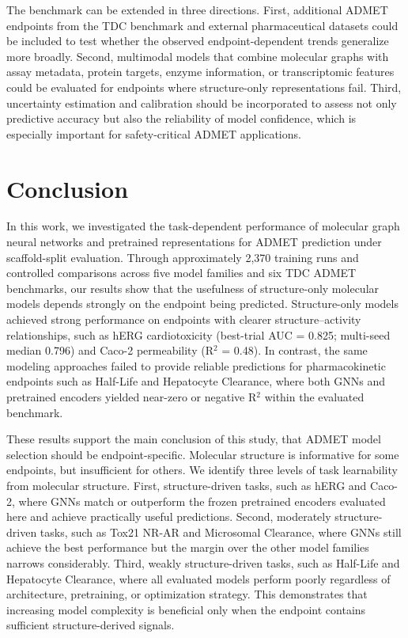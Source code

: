 \documentclass[journal]{IEEEtran}
\begin{document}
The benchmark can be extended in three directions.
First, additional ADMET endpoints from the TDC benchmark and external pharmaceutical datasets could be included to test whether the observed endpoint-dependent trends generalize more broadly.
Second, multimodal models that combine molecular graphs with assay metadata, protein targets, enzyme information, or transcriptomic features could be evaluated for endpoints where structure-only representations fail.
Third, uncertainty estimation and calibration should be incorporated to assess not only predictive accuracy but also the reliability of model confidence, which is especially important for safety-critical ADMET applications.


\section{Conclusion}
\label{sec:conclusion}

In this work, we investigated the task-dependent performance of molecular graph neural networks and pretrained representations for ADMET prediction under scaffold-split evaluation. Through approximately 2{,}370 training runs and controlled comparisons across five model families and six TDC ADMET benchmarks, our results show that the usefulness of structure-only molecular models depends strongly on the endpoint being predicted. Structure-only models achieved strong performance on endpoints with clearer structure--activity relationships, such as hERG cardiotoxicity (best-trial AUC = 0.825; multi-seed median 0.796) and Caco-2 permeability (R$^2$ = 0.48). In contrast, the same modeling approaches failed to provide reliable predictions for pharmacokinetic endpoints such as Half-Life and Hepatocyte Clearance, where both GNNs and pretrained encoders yielded near-zero or negative R$^2$ within the evaluated benchmark.

These results support the main conclusion of this study, that ADMET model selection should be endpoint-specific. Molecular structure is informative for some endpoints, but insufficient for others. We identify three levels of task learnability from molecular structure. First, structure-driven tasks, such as hERG and Caco-2, where GNNs match or outperform the frozen pretrained encoders evaluated here and achieve practically useful predictions. Second, moderately structure-driven tasks, such as Tox21 NR-AR and Microsomal Clearance, where GNNs still achieve the best performance but the margin over the other model families narrows considerably. Third, weakly structure-driven tasks, such as Half-Life and Hepatocyte Clearance, where all evaluated models perform poorly regardless of architecture, pretraining, or optimization strategy. This demonstrates that increasing model complexity is beneficial only when the endpoint contains sufficient structure-derived signals.
\end{document}
